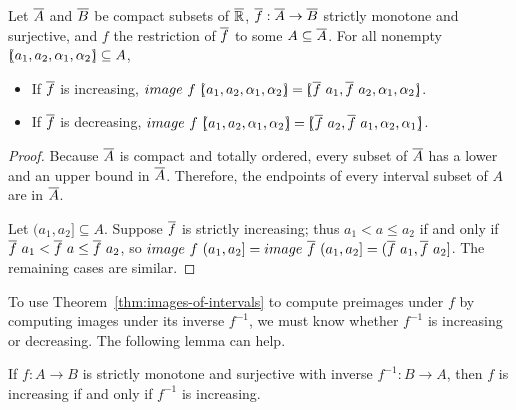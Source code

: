 \documentclass[preprint]{sigplanconf}
\DeclarePairedDelimiter{\ivl}{[\mspace{-4.5mu}(}{)\mspace{-4.5mu}]}
\begin{document}
\begin{theorem}
\label{thm:images-of-intervals}
Let $\cl{A}$ and $\cl{B}$ be compact subsets of $\cl{\Re}$, $\cl{f} : \cl{A} \to \cl{B}$ strictly monotone and surjective, and $f$ the restriction of $\cl{f}$ to some $A \subseteq \cl{A}$.
For all nonempty $\ivl{a_1,a_2,\alpha_1,\alpha_2} \subseteq A$,
\begin{itemize}
	\item If $\cl{f}$ is increasing, $image~f~\ivl{a_1,a_2,\alpha_1,\alpha_2} = \ivl{\cl{f}~a_1, \cl{f}~a_2,\alpha_1,\alpha_2}$.
	\item If $\cl{f}$ is decreasing, $image~f~\ivl{a_1,a_2,\alpha_1,\alpha_2} = \ivl{\cl{f}~a_2, \cl{f}~a_1,\alpha_2,\alpha_1}$.
\end{itemize}
\end{theorem}
\begin{proof}
Because $\cl{A}$ is compact and totally ordered, every subset of $\cl{A}$ has a lower and an upper bound in $\cl{A}$.
Therefore, the endpoints of every interval subset of $A$ are in $\cl{A}$.

Let $(a_1,a_2] \subseteq A$.
Suppose $\cl{f}$ is strictly increasing; thus $a_1 < a \leq a_2$ if and only if $\cl{f}~a_1 < \cl{f}~a \leq \cl{f}~a_2$, so $image~f~(a_1,a_2] = image~\cl{f}~(a_1,a_2] = (\cl{f}~a_1,\cl{f}~a_2]$.
The remaining cases are similar.
\end{proof}

To use Theorem~\ref{thm:images-of-intervals} to compute preimages under $f$ by computing images under its inverse $f^{-1}$, we must know whether $f^{-1}$ is increasing or decreasing.
The following lemma can help.

\begin{lemma}
\label{lem:inverse-direction}
If $f : A \to B$ is strictly monotone and surjective with inverse $f^{-1} : B \to A$, then $f$ is increasing if and only if $f^{-1}$ is increasing.
\end{lemma}
\end{document}
